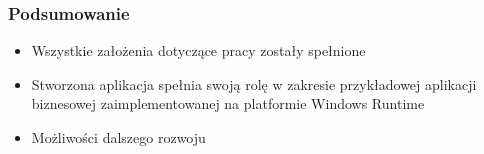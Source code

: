 \documentclass{beamer}
\begin{document}
\begin{frame}
\frametitle{Podsumowanie}
\begin{itemize}
\item Wszystkie założenia dotyczące pracy zostały spełnione

\item Stworzona aplikacja spełnia swoją rolę w zakresie przykładowej aplikacji biznesowej zaimplementowanej na platformie Windows Runtime

\item Możliwości dalszego rozwoju
\end{itemize}
\end{frame}

\begin{frame}
\maketitle
\end{frame}
\end{document}
